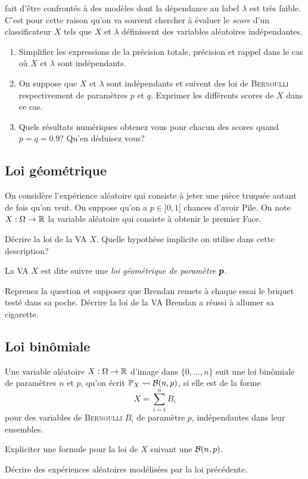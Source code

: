 \documentclass[11pt, a4paper]{article}
\begin{document}
fait d'être confrontés à des modèles dont la dépendance au label
$\lambda$ est très faible. C'est pour cette raison qu'on va souvent
chercher à évaluer le \emph{score} d'un classificateur $X$ tels que
$X$ et $\lambda$ définissent des variables aléatoires indépendantes.
\begin{question}
  \begin{enumerate}
  \item Simplifier les expressions de la précision totale, précision
    et rappel dans le cas où $X$ et $\lambda$ sont indépendants.
  \item On suppose que $X$ et $\lambda$ sont indépendants et suivent
    des loi de \textsc{Bernoulli} respectivement de paramètres $p$ et
    $q$. Exprimer les différents scores de $X$ dans ce cas.
  \item Quels résultats numériques obtenez vous pour chacun des scores
    quand $p=q=0.9$? Qu'en déduisez vous?
  \end{enumerate}
\end{question}

\subsection{Loi géométrique}
\label{sec:loigéométrique}

On considère l'expérience aléatoire qui consiste à jeter une pièce
truquée autant de fois qu'on veut. On suppose qu'on a $p \in ]0, 1[$
chances d'avoir Pile. On note $X : \Omega \to \mathbb{R}$ la variable
aléatoire qui consiste à obtenir le premier Face.
\begin{question}
  Décrire la loi de la VA $X$. Quelle hypothèse implicite on utilise
  dans cette description?
\end{question}
La VA $X$ est dite suivre une \emph{loi géométrique de paramètre
  $\boldsymbol{p}$}.
\begin{question}
  Reprenez la question  et supposez que Brendan remets
  à chaque essai le briquet testé dans sa poche. Décrire la loi de la
  VA Brendan a réussi à allumer sa cigarette.
\end{question}

\subsection{Loi binômiale}
\label{sec:loibinomiale}

Une variable aléatoire $X : \Omega \to \mathbb{R}$ d'image dans
$\{0, \ldots, n\}$ suit une loi binômiale de paramètres $n$ et $p$,
qu'on écrit $\operatorname{\mathbb{P}}_X \leadsto \mathcal{B}(n, p)$, si elle est de la forme
\[
  X = \sum_{i = 1}^n B_i
\]
pour des variables de \textsc{Bernoulli} $B_i$ de paramètre $p$, indépendantes
dans leur ensembles.
\begin{question}
  Expliciter une formule pour la loi de $X$ suivant une
  $\mathcal{B}(n, p)$.
\end{question}
\begin{question}
  Décrire des expériences aléatoires modélisées par la loi précédente.
\end{question}
\end{document}
